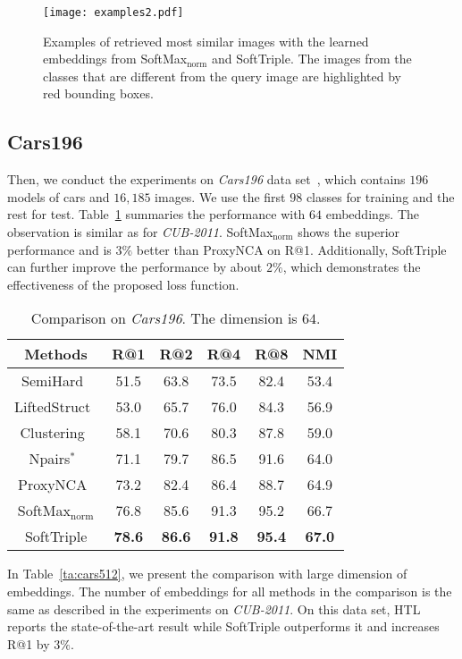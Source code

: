 \documentclass[10pt,twocolumn,letterpaper]{article}
\begin{document}
\begin{figure}[!ht]
\centering
\texttt{[image: examples2.pdf]}
\caption{Examples of retrieved most similar images with the learned embeddings from SoftMax$_\mathrm{norm}$ and SoftTriple. The images from the classes that are different from the query image are highlighted by red bounding boxes.}\label{fig:exa}
\end{figure}

\subsection{Cars196}

Then, we conduct the experiments on \textit{Cars196} data set~\cite{3DRR2013}, which contains $196$ models of cars and $16,185$ images. We use the first $98$ classes for training and the rest for test. Table~\ref{ta:cars64} summaries the performance with $64$ embeddings. The observation is similar as for \textit{CUB-2011}. SoftMax$_{\mathrm{norm}}$ shows the superior performance and is $3\%$ better than ProxyNCA on R@1. Additionally, SoftTriple can further improve the performance by about $2\%$, which demonstrates the effectiveness of the proposed loss function.

\begin{table}[!ht]
\centering
\small
\caption{Comparison on \textit{Cars196}. The dimension is $64$.}\label{ta:cars64}
\begin{tabular}{c|ccccc}
Methods&R@1&R@2&R@4&R@8&NMI\\\hline
SemiHard~\cite{SchroffKP15}&51.5&63.8&73.5&82.4&53.4\\
LiftedStruct~\cite{SongXJS16}&53.0&65.7&76.0&84.3&56.9\\
Clustering~\cite{SongJR017}&58.1&70.6&80.3&87.8&59.0\\
Npairs$^*$~\cite{Sohn16}&71.1&79.7&86.5&91.6&64.0\\
ProxyNCA~\cite{Attias17}&73.2&82.4&86.4&88.7&64.9\\\hline
SoftMax$_{\mathrm{norm}}$&76.8&85.6&91.3&95.2&66.7\\
SoftTriple&\textbf{78.6}&\textbf{86.6}&\textbf{91.8}&\textbf{95.4}&\textbf{67.0}\\
\end{tabular}
\end{table}

In Table~\ref{ta:cars512}, we present the comparison with large dimension of embeddings. The number of embeddings for all methods in the comparison is the same as described in the experiments on \textit{CUB-2011}. On this data set, HTL~\cite{GeHDS18} reports the state-of-the-art result while SoftTriple outperforms it and increases R@1 by $3\%$. 
\end{document}
